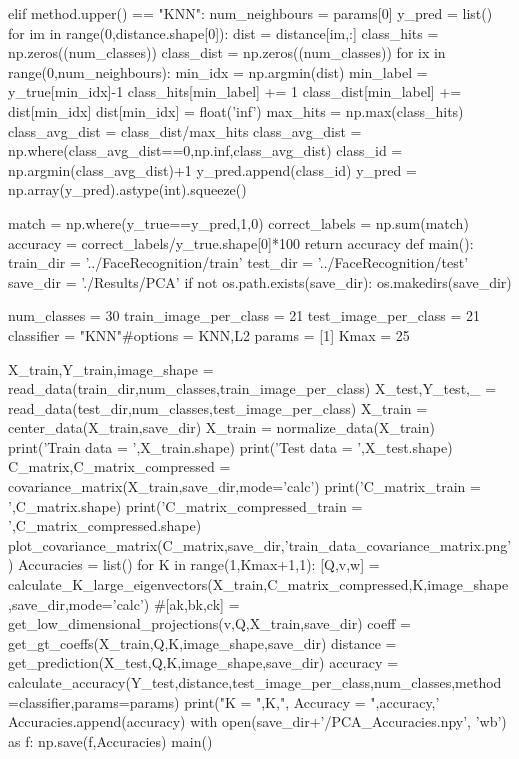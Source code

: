 \documentclass{article}
\begin{document}
\begin{python}
	elif method.upper() == "KNN":
		num_neighbours = params[0]
		y_pred = list()
		for im in range(0,distance.shape[0]):
			dist = distance[im,:]
			class_hits = np.zeros((num_classes))
			class_dist = np.zeros((num_classes))
			for ix in range(0,num_neighbours):
				min_idx = np.argmin(dist)
				min_label = y_true[min_idx]-1
				class_hits[min_label] += 1
				class_dist[min_label] += dist[min_idx]
				dist[min_idx] = float('inf')
			max_hits = np.max(class_hits)
			class_avg_dist = class_dist/max_hits
			class_avg_dist = np.where(class_avg_dist==0,np.inf,class_avg_dist)
			class_id = np.argmin(class_avg_dist)+1
			y_pred.append(class_id)
		y_pred = np.array(y_pred).astype(int).squeeze()

	match = np.where(y_true==y_pred,1,0)
	correct_labels = np.sum(match)
	accuracy = correct_labels/y_true.shape[0]*100
	return accuracy
def main():
	train_dir = '../FaceRecognition/train'
	test_dir = '../FaceRecognition/test'
	save_dir = './Results/PCA'
	if not os.path.exists(save_dir):
		os.makedirs(save_dir)

	num_classes = 30
	train_image_per_class = 21
	test_image_per_class = 21
	classifier = "KNN"#options = KNN,L2
	params = [1]
	Kmax = 25

	X_train,Y_train,image_shape = read_data(train_dir,num_classes,train_image_per_class)
	X_test,Y_test,_ = read_data(test_dir,num_classes,test_image_per_class)
	X_train = center_data(X_train,save_dir)
	X_train = normalize_data(X_train)
	print('Train data = ',X_train.shape)
	print('Test data = ',X_test.shape)
	C_matrix,C_matrix_compressed = covariance_matrix(X_train,save_dir,mode='calc')
	print('C_matrix_train = ',C_matrix.shape)
	print('C_matrix_compressed_train = ',C_matrix_compressed.shape)
	plot_covariance_matrix(C_matrix,save_dir,'train_data_covariance_matrix.png')
	Accuracies = list()
	for K in range(1,Kmax+1,1):
		[Q,v,w] = calculate_K_large_eigenvectors(X_train,C_matrix_compressed,K,image_shape,save_dir,mode='calc')
		#[ak,bk,ck] = get_low_dimensional_projections(v,Q,X_train,save_dir)
		coeff = get_gt_coeffs(X_train,Q,K,image_shape,save_dir)
		distance = get_prediction(X_test,Q,K,image_shape,save_dir)
		accuracy = calculate_accuracy(Y_test,distance,test_image_per_class,num_classes,method=classifier,params=params)
		print("K = ",K,", Accuracy = ",accuracy,'%
		Accuracies.append(accuracy)
		with open(save_dir+'/PCA_Accuracies.npy', 'wb') as f:
			np.save(f,Accuracies)
main()

\end{python}
\end{document}
